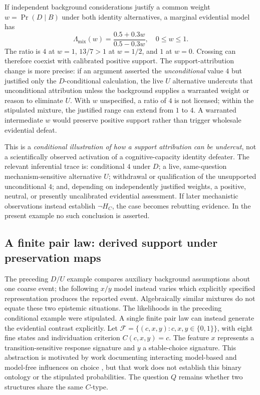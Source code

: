 \documentclass[11pt]{article}
\begin{document}
If independent background considerations justify a common weight \(w=\Pr(D\mid B)\) under both identity alternatives, a marginal evidential model has
\begin{equation}
\Lambda_{\mathrm{mix}}(w)=
\frac{0.5+0.3w}{0.5-0.3w},\quad 0\leq w\leq1.
\label{eq:m28-mixture}
\end{equation}
The ratio is \(4\) at \(w=1\), \(13/7>1\) at \(w=1/2\), and \(1\) at \(w=0\). Crossing can therefore coexist with calibrated positive support. The support-attribution change is more precise: if an argument asserted the \emph{unconditional} value \(4\) but justified only the \(D\)-conditional calculation, the live \(U\) alternative undercuts that unconditional attribution unless the background supplies a warranted weight or reason to eliminate \(U\). With \(w\) unspecified, a ratio of \(4\) is not licensed; within the stipulated mixture, the justified range can extend from \(1\) to \(4\). A warranted intermediate \(w\) would preserve positive support rather than trigger wholesale evidential defeat.

This is a \emph{conditional illustration of how a support attribution can be undercut}, not a scientifically observed activation of a cognitive-capacity identity defeater. The relevant inferential trace is: conditional \(4\) under \(D\); a live, same-question mechanism-sensitive alternative \(U\); withdrawal or qualification of the unsupported unconditional \(4\); and, depending on independently justified weights, a positive, neutral, or presently uncalibrated evidential assessment. If later mechanistic observations instead establish \(\neg H_C\), the case becomes rebutting evidence. In the present example no such conclusion is asserted.


\subsection{A finite pair law: derived support under preservation maps}
\label{sec:finite-pair-law}

The preceding \(D/U\) example compares auxiliary background assumptions about one coarse event; the following \(x/y\) model instead varies which explicitly specified representation produces the reported event. Algebraically similar mixtures do not equate these two epistemic situations. The likelihoods in the preceding conditional example were stipulated. A single finite pair law can instead generate the evidential contrast explicitly. Let \(\mathcal F=\{(c,x,y):c,x,y\in\{0,1\}\}\), with eight fine states and individuation criterion \(C(c,x,y)=c\). The feature \(x\) represents a transition-sensitive response signature and \(y\) a stable-choice signature. This abstraction is motivated by work documenting interacting model-based and model-free influences on choice \citep{DawEtAl2011ModelBasedInfluences}, but that work does not establish this binary ontology or the stipulated probabilities. The question \(Q\) remains whether two structures share the same \(C\)-type.
\end{document}
